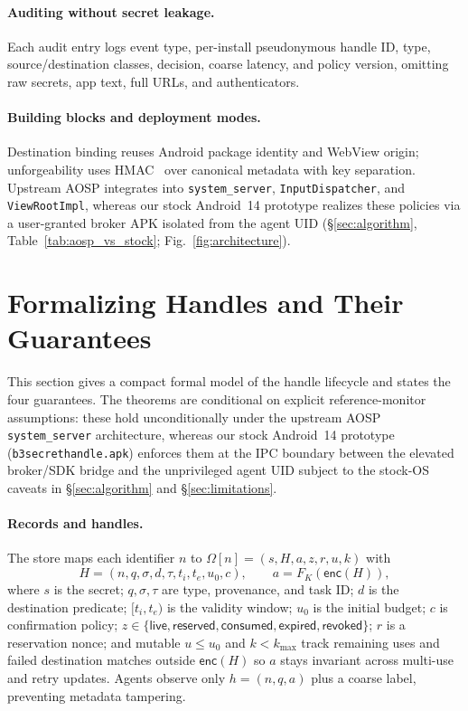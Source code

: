 \documentclass[sigconf,10pt]{acmart}
\newcommand{\enc}{\ensuremath{\mathsf{enc}}}
\theoremstyle{acmplain}%
\begin{document}
\paragraph{Auditing without secret leakage.} Each audit entry logs event type, per-install pseudonymous handle ID, type, source/destination classes, decision, coarse latency, and policy version, omitting raw secrets, app text, full URLs, and authenticators.

\paragraph{Building blocks and deployment modes.} Destination binding reuses Android package identity and WebView origin; unforgeability uses HMAC~\cite{rfc2104} over canonical metadata with key separation. Upstream AOSP integrates into \texttt{system\_server}, \texttt{InputDispatcher}, and \texttt{ViewRootImpl}, whereas our stock Android~14 prototype realizes these policies via a user-granted broker APK isolated from the agent UID (\S\ref{sec:algorithm}, Table~\ref{tab:aosp_vs_stock}; Fig.~\ref{fig:architecture}).
\section{Formalizing Handles and Their Guarantees}
\label{sec:model}

This section gives a compact formal model of the handle lifecycle and states the four guarantees. The theorems are conditional on explicit reference-monitor assumptions: these hold unconditionally under the upstream AOSP \texttt{system\_server} architecture, whereas our stock Android~14 prototype (\texttt{b3secrethandle.apk}) enforces them at the IPC boundary between the elevated broker/SDK bridge and the unprivileged agent UID subject to the stock-OS caveats in \S\ref{sec:algorithm} and \S\ref{sec:limitations}.

\paragraph{Records and handles.} The store maps each identifier $n$ to $\Omega[n]=(s,H,a,z,r,u,k)$ with
\begin{equation}
H=(n,q,\sigma,d,\tau,t_i,t_e,u_0,c),\qquad a=F_K(\enc(H)),
\label{eq:record}
\end{equation}
where $s$ is the secret; $q,\sigma,\tau$ are type, provenance, and task ID; $d$ is the destination predicate; $[t_i,t_e)$ is the validity window; $u_0$ is the initial budget; $c$ is confirmation policy; $z\in\{\mathsf{live},\mathsf{reserved},\mathsf{consumed},\mathsf{expired},\mathsf{revoked}\}$; $r$ is a reservation nonce; and mutable $u\le u_0$ and $k<k_{\max}$ track remaining uses and failed destination matches outside $\enc(H)$ so $a$ stays invariant across multi-use and retry updates. Agents observe only $h=(n,q,a)$ plus a coarse label, preventing metadata tampering.
\end{document}
